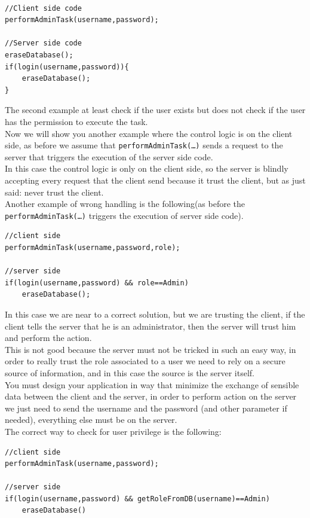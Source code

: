 \begin{lstlisting}

//Client side code
performAdminTask(username,password);

//Server side code
eraseDatabase();
if(login(username,password)){
	eraseDatabase();
}
\end{lstlisting}

The second example at least check if the user exists but does not check if the user has the permission to execute the task.\\
Now we will show you another example where the control logic is on the client side, as before we assume that \texttt{performAdminTask(…)} sends a request to the server that triggers the execution of the server side code.\\

In this case the control logic is only on the client side, so the server is blindly accepting every request that the client send because it trust the client, but as just said: never trust the client.\\
Another example of wrong handling is the following(as before the \texttt{performAdminTask(…)} triggers the execution of server side code).\\

\begin{lstlisting}
//client side
performAdminTask(username,password,role);

//server side
if(login(username,password) && role==Admin)
	eraseDatabase();
\end{lstlisting}


In this case we are near to a correct solution, but we are trusting the client, if the client tells the server that he is an administrator, then the server will trust him and perform the action.\\
This is not good because the server must not be tricked in such an easy way, in order to really trust the role associated to a user we need to rely on a secure source of information, and in this case the source is the server itself.\\
You must design your application in way that minimize the exchange of sensible data between the client and the server, in order to perform action on the server we just need to send the username and the password (and other parameter if needed), everything else must be on the server.\\
The correct way to check for user privilege is the following:

\begin{lstlisting}
//client side
performAdminTask(username,password);

//server side
if(login(username,password) && getRoleFromDB(username)==Admin)
	eraseDatabase()
\end{lstlisting}

